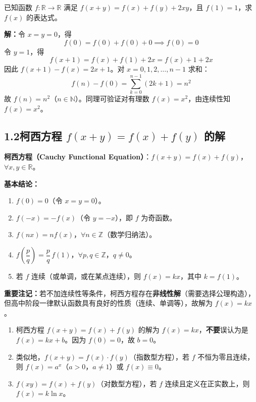 \documentclass[12pt,a4paper]{ctexart}
\begin{document}
\begin{examplebox}[例：赋值法基本应用]
已知函数 $f:\mathbb{R}\to\mathbb{R}$ 满足 $f(x+y)=f(x)+f(y)+2xy$，且 $f(1)=1$，求 $f(x)$ 的表达式。

\medskip
\textbf{解：}令 $x=y=0$，得
\[f(0)=f(0)+f(0)+0 \implies f(0)=0\]
令 $y=1$，得
\[f(x+1)=f(x)+f(1)+2x=f(x)+1+2x\]
因此 $f(x+1)-f(x)=2x+1$。对 $x=0,1,2,\ldots,n-1$ 求和：
\[f(n)-f(0)=\sum_{k=0}^{n-1}(2k+1)=n^2\]
故 $f(n)=n^2$（$n\in\mathbb{N}$）。同理可验证对有理数 $f(x)=x^2$，由连续性知 $f(x)=x^2$。
\end{examplebox}

\subsection*{1.2\quad 柯西方程 $f(x+y)=f(x)+f(y)$ 的解}

\begin{knowledgebox}[柯西方程]
\textbf{柯西方程（Cauchy Functional Equation）}：$f(x+y)=f(x)+f(y)$，$\forall x,y\in\mathbb{R}$。

\medskip
\textbf{基本结论：}
\begin{enumerate}[label=(\arabic*)]
  \item $f(0)=0$（令 $x=y=0$）。
  \item $f(-x)=-f(x)$（令 $y=-x$），即 $f$ 为奇函数。
  \item $f(nx)=nf(x)$，$\forall n\in\mathbb{Z}$（数学归纳法）。
  \item $f\!\left(\dfrac{p}{q}\right)=\dfrac{p}{q}\,f(1)$，$\forall p,q\in\mathbb{Z}$，$q\ne0$。
  \item 若 $f$ 连续（或单调，或在某点连续），则 $f(x)=kx$，其中 $k=f(1)$。
\end{enumerate}

\medskip
\textbf{重要注记：}若不加连续性等条件，柯西方程存在\textbf{非线性解}（需要选择公理构造），但高中阶段一律默认函数具有良好的性质（连续、单调等），故解为 $f(x)=kx$。
\end{knowledgebox}

\begin{warnbox}[易错提醒]
\begin{enumerate}[label=(\arabic*)]
  \item 柯西方程 $f(x+y)=f(x)+f(y)$ 的解为 $f(x)=kx$，\textbf{不要}误认为是 $f(x)=kx+b$。因为 $f(0)=0$，故 $b=0$。
  \item 类似地，$f(x+y)=f(x)\cdot f(y)$（指数型方程），若 $f$ 不恒为零且连续，则 $f(x)=a^x$（$a>0$，$a\ne1$）或 $f(x)\equiv0$。
  \item $f(xy)=f(x)+f(y)$（对数型方程），若 $f$ 连续且定义在正实数上，则 $f(x)=k\ln x$。
\end{enumerate}
\end{warnbox}
\end{document}
